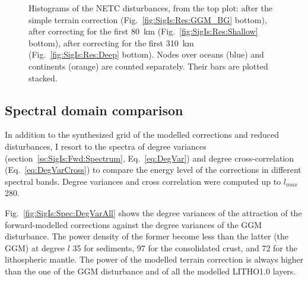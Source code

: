 \begin{figure}
    \begin{adjustbox}{center}
    \end{adjustbox}
    \caption[Histograms of the NETC disturbances, including the first \num{80} and \SI{310}{\kilo \metre} corrections.]{
        Histograms of the NETC disturbances, from the top plot: after the simple terrain correction (Fig.~\ref{fig:SigIs:Res:GGM_BG} bottom), after correcting for the first \SI{80}{\kilo \metre} (Fig.~\ref{fig:SigIs:Res:Shallow} bottom), after correcting for the first \SI{310}{\kilo \metre} (Fig.~\ref{fig:SigIs:Res:Deep} bottom).
        Nodes over oceans (blue) and continents (orange) are counted separately. Their bars are plotted stacked.
    }
    \label{fig:SigIs:Res:HistBGs}
\end{figure}

\FloatBarrier

\subsection{Spectral domain comparison}
\label{ss:SigIs:Results:Spectral}
In addition to the synthesized grid of the modelled corrections and reduced disturbances, I resort to the spectra of degree variances (section~\ref{ss:SigIs:Fwd:Spectrum}, Eq.~\ref{eq:DegVar}) and degree cross-correlation (Eq.~\ref{eq:DegVarCross}) to compare the energy level of the corrections in different spectral bands.
Degree variances and cross correlation were computed up to $l_{max}$ \num{280}.

Fig.~\ref{fig:SigIs:Spec:DegVarAll} shows the degree variances of the attraction of the forward-modelled corrections against the degree variances of the GGM disturbance.
The power density of the former become less than the latter (the GGM) at degree $l$ \num{35} for sediments, \num{97} for the consolidated crust, and \num{72} for the lithospheric mantle.
The power of the modelled terrain correction is always higher than the one of the GGM disturbance and of all the modelled {LITHO1.0} layers.

